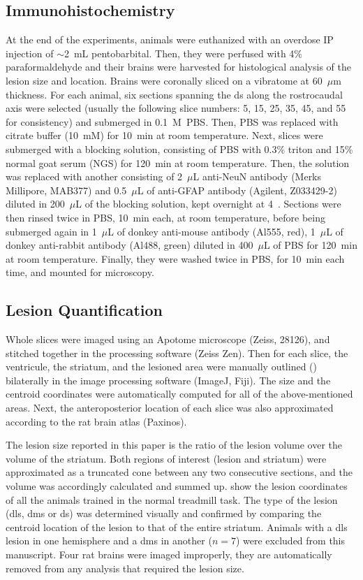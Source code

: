 \subsection{Immunohistochemistry}
At the end of the experiments, animals were euthanized with an overdose IP injection of $\sim$2~mL pentobarbital.
Then, they were perfused with 4\% paraformaldehyde and their brains were harvested for histological analysis of the lesion size and location.
Brains were coronally sliced on a vibratome at 60~$\mu$m thickness.
For each animal, six sections spanning the \gls{ds} along the rostrocaudal axis were selected (usually the following slice numbers: 5, 15, 25, 35, 45, and 55 for consistency) and submerged in 0.1~M~PBS.
Then, PBS was replaced with citrate buffer (10~mM) for 10~min at room temperature.
Next, slices were submerged with a blocking solution, consisting of PBS with 0.3\% triton and 15\% normal goat serum (NGS) for 120~min at room temperature.
Then, the solution was replaced with another consisting of 2~$\mu$L anti-NeuN antibody (Merks Millipore, MAB377) and 0.5~$\mu$L of anti-GFAP antibody (Agilent, Z033429-2) diluted in 200~$\mu$L of the blocking solution, kept overnight at 4~\textcelsius.
Sections were then rinsed twice in PBS, 10~min each, at room temperature, before being submerged again in 1~$\mu$L of donkey anti-mouse antibody (Al555, red), 1~$\mu$L of donkey anti-rabbit antibody (Al488, green) diluted in 400~$\mu$L of PBS for 120~min at room temperature.
Finally, they were washed twice in PBS, for 10~min each time, and mounted for microscopy.

\subsection{Lesion Quantification}
Whole slices were imaged using an Apotome microscope (Zeiss, 28126), and stitched together in the processing software (Zeiss Zen).
Then for each slice, the ventricule, the striatum, and the lesioned area were manually outlined () bilaterally in the image processing software (ImageJ, Fiji).
The size and the centroid coordinates were automatically computed for all of the above-mentioned areas.
Next, the anteroposterior location of each slice was also approximated according to the rat brain atlas (Paxinos).
\par
The lesion size reported in this paper is the ratio of the lesion volume over the volume of the striatum.
Both regions of interest (lesion and striatum) were approximated as a truncated cone between any two consecutive sections, and the volume was accordingly calculated and summed up.
 show the lesion coordinates of all the animals trained in the normal treadmill task.
The type of the lesion (\gls{dls}, \gls{dms} or \gls{ds}) was determined visually and confirmed by comparing the centroid location of the lesion to that of the entire striatum.
Animals with a \gls{dls} lesion in one hemisphere and a \gls{dms} in another ($n=7$) were excluded from this manuscript.
Four rat brains were imaged improperly, they are automatically removed from any analysis that required the lesion size.


